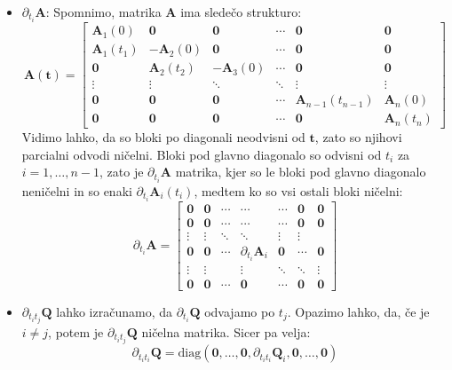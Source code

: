 \documentclass[mat2, tisk]{fmfdelo}
\newcommand{\qmat}{\mathbf{Q}}
\newcommand{\amat}{\mathbf{A}}
\newcommand{\tvec}{\mathbf{t}}
\begin{document}
\begin{itemize}
\item $\partial_{t_i} \amat$:
Spomnimo, matrika $\amat$ ima sledečo strukturo:
\begin{equation}
    \amat(\tvec) = 
    \begin{bmatrix}
    \amat_1(0) & \mathbf{0} & \mathbf{0} & \cdots & \mathbf{0} & \mathbf{0} \\
    \amat_1(t_1) & -\amat_2(0) & \mathbf{0} & \cdots & \mathbf{0} & \mathbf{0} \\
    \mathbf{0} & \amat_2(t_2) & - \amat_3(0) & \cdots & \mathbf{0} & \mathbf{0} \\
    \vdots & \vdots & \ddots & \ddots & \vdots & \vdots \\
    \mathbf{0} & \mathbf{0} & \mathbf{0} &\cdots & \amat_{n-1}(t_{n-1}) & \amat_n(0) \\
    \mathbf{0} & \mathbf{0} & \mathbf{0} &\cdots & \mathbf{0} & \amat_n(t_n)
    \end{bmatrix}
\end{equation}
Vidimo lahko, da so bloki po diagonali neodvisni od $\tvec$, zato so njihovi parcialni odvodi ničelni. Bloki pod glavno diagonalo so odvisni od $t_i$ za $i=1,\ldots,n-1$, zato je $\partial_{t_i} \amat$ matrika, kjer so le bloki pod glavno diagonalo neničelni in so enaki $\partial_{t_i} \amat_i(t_i)$, medtem ko so vsi ostali bloki ničelni:
\begin{equation}
    \partial_{t_i} \amat =
    \begin{bmatrix}
    \mathbf{0} & \mathbf{0} & \cdots & \cdots & \cdots & \mathbf{0} & \mathbf{0} \\
    \mathbf{0} & \mathbf{0} & \cdots & \cdots & \cdots & \mathbf{0} & \mathbf{0} \\
    \vdots & \vdots & \ddots & \ddots & \vdots & \vdots \\
    \mathbf{0} & \mathbf{0} & \cdots & \partial_{t_i} \amat_i & \mathbf{0} & \cdots & \mathbf{0} \\
    \vdots & \vdots & & \vdots & \ddots & \ddots & \vdots \\
    \mathbf{0} & \mathbf{0} &\cdots & \mathbf{0} & \cdots & \mathbf{0} & \mathbf{0}
    \end{bmatrix}
\end{equation}

\item $\partial_{t_it_j}\qmat$ lahko izračunamo, da $\partial_{t_i} \qmat$ odvajamo po $t_j$. Opazimo lahko, da, če je $i \neq j$, potem je $\partial_{t_it_j}\qmat$ ničelna matrika. Sicer pa velja:
\begin{equation}
    \partial_{t_it_i} \mathbf{Q} = \text{diag}(\mathbf{0}, \ldots, \mathbf{0}, \partial_{t_it_i} \qmat_i, \mathbf{0}, \ldots, \mathbf{0})
\end{equation}


\end{itemize}
\end{document}
